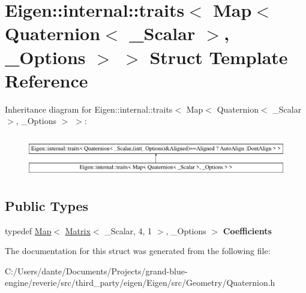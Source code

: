 \hypertarget{struct_eigen_1_1internal_1_1traits_3_01_map_3_01_quaternion_3_01___scalar_01_4_00_01___options_01_4_01_4}{}\section{Eigen\+::internal\+::traits$<$ Map$<$ Quaternion$<$ \+\_\+\+Scalar $>$, \+\_\+\+Options $>$ $>$ Struct Template Reference}
\label{struct_eigen_1_1internal_1_1traits_3_01_map_3_01_quaternion_3_01___scalar_01_4_00_01___options_01_4_01_4}
Inheritance diagram for Eigen\+::internal\+::traits$<$ Map$<$ Quaternion$<$ \+\_\+\+Scalar $>$, \+\_\+\+Options $>$ $>$\+:\begin{figure}[H]
\begin{center}
\leavevmode
\includegraphics[height=1.821138cm]{struct_eigen_1_1internal_1_1traits_3_01_map_3_01_quaternion_3_01___scalar_01_4_00_01___options_01_4_01_4}
\end{center}
\end{figure}
\subsection*{Public Types}
\begin{DoxyCompactItemize}
\item 
\mbox{\label{struct_eigen_1_1internal_1_1traits_3_01_map_3_01_quaternion_3_01___scalar_01_4_00_01___options_01_4_01_4_aa41e45edf2c262979cc05621d1a877f2}} 
typedef \mbox{\hyperlink{class_eigen_1_1_map}{Map}}$<$ \mbox{\hyperlink{class_eigen_1_1_matrix}{Matrix}}$<$ \+\_\+\+Scalar, 4, 1 $>$, \+\_\+\+Options $>$ {\bfseries Coefficients}
\end{DoxyCompactItemize}


The documentation for this struct was generated from the following file\+:\begin{DoxyCompactItemize}
\item 
C\+:/\+Users/dante/\+Documents/\+Projects/grand-\/blue-\/engine/reverie/src/third\+\_\+party/eigen/\+Eigen/src/\+Geometry/Quaternion.\+h\end{DoxyCompactItemize}
